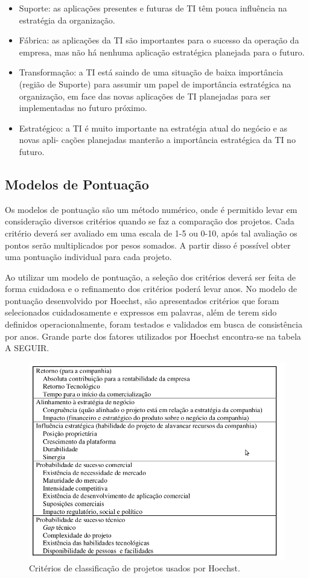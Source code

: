 \documentclass[12pt,a4paper,ruledheader,tocpage=prefix,floatnumber=continuous,pagestart=folhaderosto,font=times]{abnt}
\begin{document}
\begin{itemize}
 \item Suporte: as aplicações presentes e futuras de TI têm pouca influência na estratégia da
	organização.
  \item Fábrica: as aplicações da TI são importantes para o sucesso da operação da empresa, 
	mas não há nenhuma aplicação estratégica planejada para o futuro.
  \item Transformação: a TI está saindo de uma situação de baixa importância (região de
	Suporte) para assumir um papel de importância estratégica na organização, em
        face das novas aplicações de TI planejadas para ser implementadas no futuro próximo.
  \item Estratégico: a TI é muito importante na estratégia atual do negócio e as novas apli-
        cações planejadas manterão a importância estratégica da TI no futuro.
\end{itemize}

\subsection{Modelos de Pontuação}
Os modelos de pontuação são um método numérico, onde é permitido levar em consideração diversos critérios quando se faz a comparação dos projetos. Cada
critério deverá ser avaliado em uma escala de 1-5 ou 0-10, após tal avaliação os pontos serão multiplicados por pesos somados. A partir disso é possível
obter uma pontuação individual para cada projeto. 

Ao utilizar um modelo de pontuação, a seleção dos critérios deverá ser feita de forma cuidadosa e o refinamento dos critérios poderá levar anos. No modelo 
de pontuação desenvolvido por Hoechst, são apresentados critérios que foram selecionados cuidadosamente e expressos em palavras, além de terem sido definidos 
operacionalmente, foram testados e validados em busca de consistência por anos. Grande parte dos fatores utilizados por Hoechst encontra-se na tabela A SEGUIR.

\begin{figure}[H]
\centering
\includegraphics[width=.9\textwidth]{tabela_hoechst.png}
\caption{Critérios de classificação de projetos usados por Hoechst\cite{cooper}.}
\end{figure} 
\end{document}
